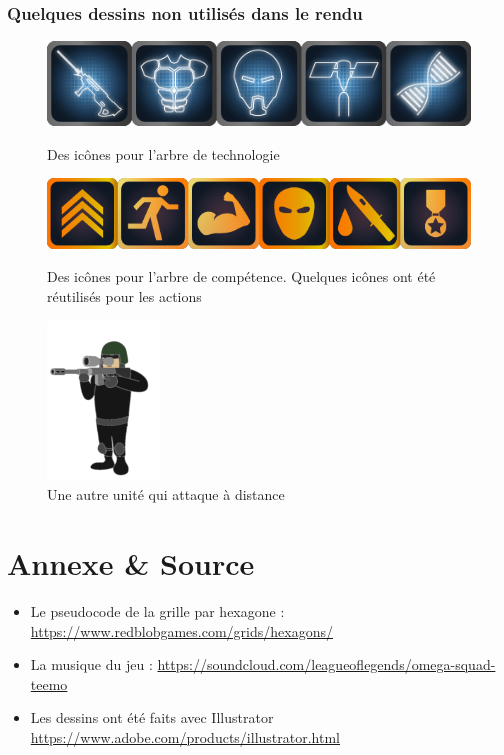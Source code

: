 \documentclass{article}
\begin{document}
\subsubsection{Quelques dessins non utilisés dans le rendu}
    \begin{figure}[H]
        \centering
     \includegraphics[scale=0.5]{asset/image/tech.png}
    \caption{Des icônes pour l'arbre de technologie}
    \vspace{1cm}

     \includegraphics[scale=0.5]{asset/image/skill.png}
    \caption{Des icônes pour l'arbre de compétence. Quelques icônes ont été réutilisés pour les actions}
    \vspace{1cm}

     \includegraphics[scale=0.5]{asset/image/sniper_eu.png}
    \caption{Une autre unité qui attaque à distance}
    \end{figure}

\section{Annexe \& Source}
\begin{itemize}
    \item Le pseudocode de la grille par hexagone : \url{https://www.redblobgames.com/grids/hexagons/}
    \item La musique du jeu : \url{https://soundcloud.com/leagueoflegends/omega-squad-teemo}
    \item Les dessins ont été faits avec Illustrator \url{https://www.adobe.com/products/illustrator.html}
\end{itemize}
\end{document}
